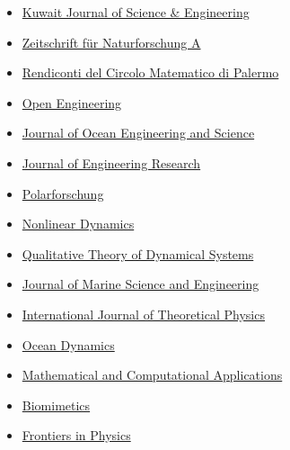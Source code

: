 \documentclass[final, a4paper, oneside, 12pt]{article}
\numberwithin{equation}{section}
\begin{document}
\begin{itemize}
    \item \href{http://pubcouncil.kuniv.edu.kw/kjs/}%
    {Kuwait Journal of Science \& Engineering}
    
    \item \href{http://www.degruyter.com/view/j/zna}%
    {Zeitschrift f\"ur Naturforschung A}
    
    \item \href{http://www.springer.com/mathematics/journal/12215}%
    {Rendiconti del Circolo Matematico di Palermo }
    
    \item \href{https://www.degruyter.com/view/j/eng}%
    {Open Engineering}

    \item \href{https://www.sciencedirect.com/journal/journal-of-ocean-engineering-and-science/}%
    {Journal of Ocean Engineering and Science}

    \item \href{https://www.sciencedirect.com/journal/journal-of-engineering-research/}%
    {Journal of Engineering Research}
    
    \item \href{http://www.polarforschung.de/}%
    {Polarforschung}
    
    \item \href{https://link.springer.com/journal/11071}%
    {Nonlinear Dynamics}

    \item \href{https://link.springer.com/journal/12346}%
    {Qualitative Theory of Dynamical Systems}

    \item \href{https://www.mdpi.com/journal/jmse/}%
    {Journal of Marine Science and Engineering}

    \item \href{https://link.springer.com/journal/10773/}%
    {International Journal of Theoretical Physics}

    \item \href{https://link.springer.com/journal/10236/}%
    {Ocean Dynamics}
    
    \item \href{https://www.mdpi.com/journal/mca/}%
    {Mathematical and Computational Applications}

    \item \href{https://www.mdpi.com/journal/biomimetics/}%
    {Biomimetics}

    \item \href{https://www.frontiersin.org/journals/physics/}%
    {Frontiers in Physics}


\end{itemize}
\end{document}
